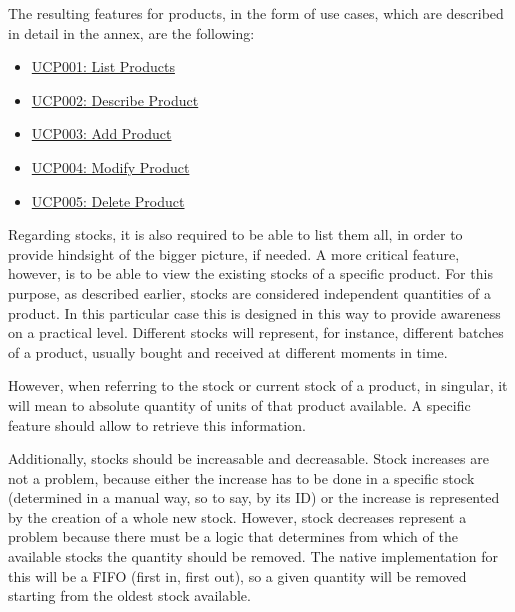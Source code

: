 The resulting features for products, in the form of use cases, which are described in detail in the annex, are the following:
\hfill\break
\begin{itemize}
\item \hyperref[UCP001]{UCP001: List Products}
\item \hyperref[UCP002]{UCP002: Describe Product}
\item \hyperref[UCP003]{UCP003: Add Product}
\item \hyperref[UCP004]{UCP004: Modify Product}
\item \hyperref[UCP005]{UCP005: Delete Product}
\end{itemize}
\hfill\break
Regarding stocks, it is also required to be able to list them all, in order to provide hindsight of the bigger picture, if needed. A more critical feature, however, is to be able to view the existing stocks of a specific product. For this purpose, as described earlier, stocks are considered independent quantities of a product. In this particular case this is designed in this way to provide awareness on a practical level. Different stocks will represent, for instance, different batches of a product, usually bought and received at different moments in time.

However, when referring to the stock or current stock of a product, in singular, it will mean to absolute quantity of units of that product available. A specific feature should allow to retrieve this information.

Additionally, stocks should be increasable and decreasable. Stock increases are not a problem, because either the increase has to be done in a specific stock (determined in a manual way, so to say, by its ID) or the increase is represented by the creation of a whole new stock. However, stock decreases represent a problem because there must be a logic that determines from which of the available stocks the quantity should be removed. The native implementation for this will be a FIFO (first in, first out), so a given quantity will be removed starting from the oldest stock available.

